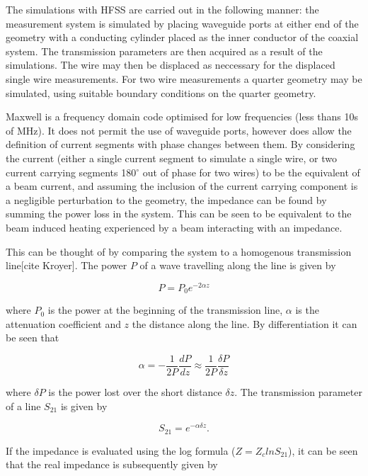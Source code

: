 The simulations with HFSS are carried out in the following manner: the measurement system is simulated by placing waveguide ports at either end of the geometry with a conducting cylinder placed as the inner conductor of the coaxial system. The transmission parameters are then acquired as a result of the simulations. The wire may then be displaced as neccessary for the displaced single wire measurements. For two wire measurements a quarter geometry may be simulated, using suitable boundary conditions on the quarter geometry.

Maxwell is a frequency domain code optimised for low frequencies (less thans 10s of MHz). It does not permit the use of waveguide ports, however does allow the definition of current segments with phase changes between them. By considering the current (either a single current segment to simulate a single wire, or two current carrying segments 180$^{\circ}$ out of phase for two wires) to be the equivalent of a beam current, and assuming the inclusion of the current carrying component is a negligible perturbation to the geometry, the impedance can be found by summing the power loss in the system. This can be seen to be equivalent to the beam induced heating experienced by a beam interacting with an impedance.

This can be thought of by comparing the system to a homogenous transmission line[cite Kroyer]. The power $P$ of a wave travelling along the line is given by 

\begin{equation}
P = P_{0}e^{-2\alpha z}
\end{equation}

where $P_{0}$ is the power at the beginning of the transmission line, $\alpha$ is the attenuation coefficient and $z$ the distance along the line. By differentiation it can be seen that

\begin{equation}
\alpha = -\frac{1}{2P} \frac{dP}{dz} \approx \frac{1}{2P} \frac{\delta P}{\delta z}
\end{equation}

where $\delta P$ is the power lost over the short distance $\delta z$. The transmission parameter of a line $S_{21}$ is given by

\begin{equation}
S_{21} = e^{-\alpha \delta z}.
\end{equation}

If the impedance is evaluated using the log formula ($Z = Z_{c}ln S_{21}$), it can be seen that the real impedance is subsequently given by

